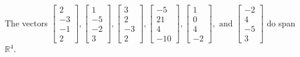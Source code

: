 \begin{exercise}
\begin{exerciseStatement}
  \end{exerciseStatement}
  \begin{exerciseAnswer}
   The vectors \(\left[\begin{array}{r}
2 \\
-3 \\
-1 \\
2
\end{array}\right] , \left[\begin{array}{r}
1 \\
-5 \\
-2 \\
3
\end{array}\right] , \left[\begin{array}{r}
3 \\
2 \\
-3 \\
2
\end{array}\right] , \left[\begin{array}{r}
-5 \\
21 \\
4 \\
-10
\end{array}\right] , \left[\begin{array}{r}
1 \\
0 \\
4 \\
-2
\end{array}\right] , \text{ and } \left[\begin{array}{r}
-2 \\
4 \\
-5 \\
3
\end{array}\right]\) 
  	 do  
	span \(\mathbb{R}^4\).
  


  \end{exerciseAnswer}
\end{exercise}
